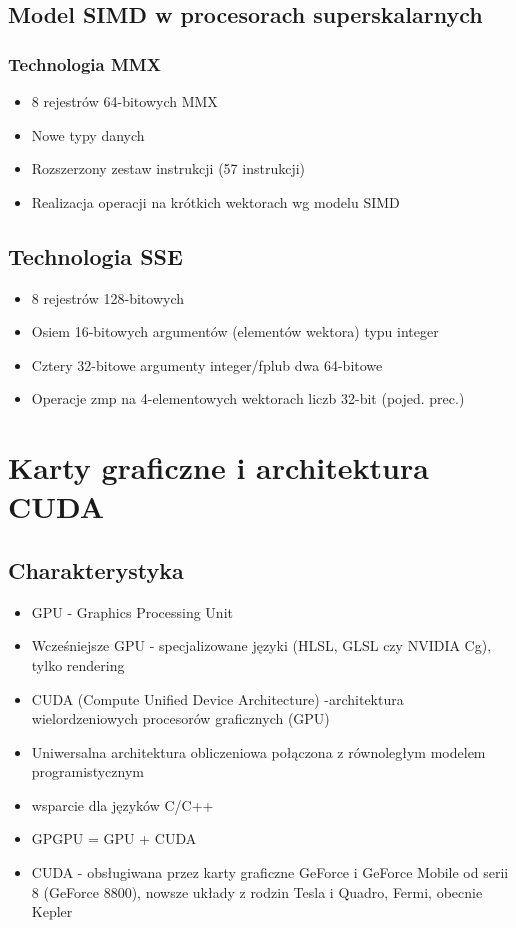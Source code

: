 	\subsection{Model SIMD w procesorach superskalarnych}
		\subsubsection{Technologia MMX}
			\begin{itemize}
				\item 8 rejestrów 64-bitowych MMX
				\item Nowe typy danych
				\item Rozszerzony zestaw instrukcji (57 instrukcji)
				\item Realizacja operacji na krótkich wektorach wg modelu SIMD
			\end{itemize}
	\subsection{Technologia SSE}
		\begin{itemize}
			\item 8 rejestrów 128-bitowych
			\item Osiem 16-bitowych argumentów (elementów wektora) typu integer
			\item Cztery 32-bitowe argumenty integer/fplub dwa 64-bitowe
			\item Operacje zmp na 4-elementowych wektorach liczb 32-bit (pojed. prec.)
		\end{itemize}

\section{Karty graficzne i architektura CUDA}
	\subsection{Charakterystyka}
		\begin{itemize}
			\item GPU - Graphics Processing Unit
			\item Wcześniejsze GPU - specjalizowane języki (HLSL, GLSL czy NVIDIA Cg), tylko rendering
			\item CUDA (Compute Unified Device Architecture) -architektura wielordzeniowych procesorów graficznych (GPU)
			\item Uniwersalna architektura obliczeniowa połączona z równoległym modelem programistycznym
			\item wsparcie dla języków C/C++
			\item GPGPU = GPU + CUDA
			\item CUDA - obsługiwana przez karty graficzne GeForce i GeForce Mobile od serii 8 (GeForce 8800), nowsze układy z rodzin Tesla i Quadro, Fermi, obecnie Kepler
		\end{itemize}
